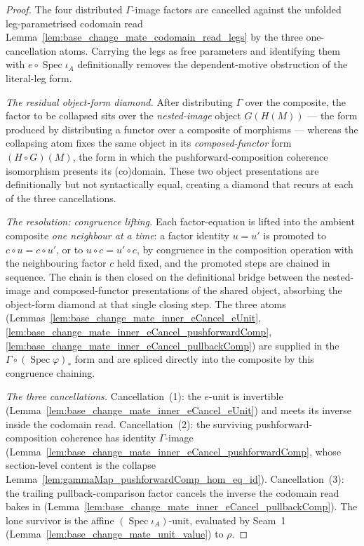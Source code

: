 \begin{proof}
  The four distributed \(\Gamma\)-image factors are cancelled against the unfolded leg-parametrised
  codomain read Lemma~\ref{lem:base_change_mate_codomain_read_legs} by the three one-cancellation
  atoms. Carrying the legs as free parameters and identifying them with
  \(e \circ \operatorname{Spec}\iota_A\) definitionally removes the dependent-motive obstruction of
  the literal-leg form.

  \emph{The residual object-form diamond.} After distributing \(\Gamma\) over the composite, the
  factor to be collapsed sits over the \emph{nested-image} object \(G(H(M))\) — the form produced
  by distributing a functor over a composite of morphisms — whereas the collapsing atom fixes the
  same object in its \emph{composed-functor} form \((H \circ G)(M)\), the form in which the
  pushforward-composition coherence isomorphism presents its (co)domain. These two object
  presentations are definitionally but not syntactically equal, creating a diamond that recurs at
  each of the three cancellations.

  \emph{The resolution: congruence lifting.} Each factor-equation is lifted into the ambient
  composite \emph{one neighbour at a time}: a factor identity \(u = u'\) is promoted to
  \(c \circ u = c \circ u'\), or to \(u \circ c = u' \circ c\), by congruence in the composition
  operation with the neighbouring factor \(c\) held fixed, and the promoted steps are chained in
  sequence. The chain is then closed on the definitional bridge between the nested-image and
  composed-functor presentations of the shared object, absorbing the object-form diamond at that
  single closing step. The three atoms
  (Lemmas~\ref{lem:base_change_mate_inner_eCancel_eUnit},
  \ref{lem:base_change_mate_inner_eCancel_pushforwardComp},
  \ref{lem:base_change_mate_inner_eCancel_pullbackComp}) are supplied in the
  \(\Gamma \circ (\operatorname{Spec}\varphi)_{*}\) form and are spliced directly into the composite
  by this congruence chaining.

  \emph{The three cancellations.} Cancellation~(1): the \(e\)-unit is invertible
  (Lemma~\ref{lem:base_change_mate_inner_eCancel_eUnit}) and meets its inverse inside the codomain
  read. Cancellation~(2): the surviving pushforward-composition coherence has identity
  \(\Gamma\)-image (Lemma~\ref{lem:base_change_mate_inner_eCancel_pushforwardComp}, whose
  section-level content is the collapse Lemma~\ref{lem:gammaMap_pushforwardComp_hom_eq_id}).
  Cancellation~(3): the trailing pullback-comparison factor cancels the inverse the codomain read
  bakes in (Lemma~\ref{lem:base_change_mate_inner_eCancel_pullbackComp}). The lone survivor is the
  affine \((\operatorname{Spec}\iota_A)\)-unit, evaluated by Seam~1
  (Lemma~\ref{lem:base_change_mate_unit_value}) to \(\rho\).
\end{proof}

